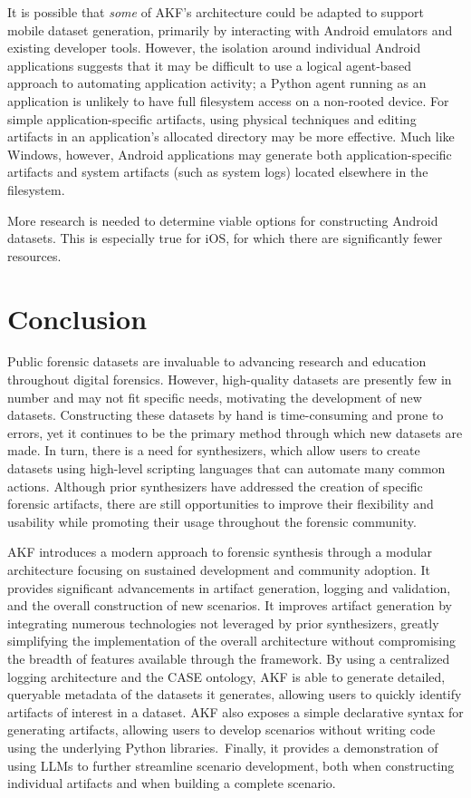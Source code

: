 \documentclass[letterpaper,12pt]{report}
\begin{document}
It is possible that \emph{some} of AKF's architecture could be adapted
to support mobile dataset generation, primarily by interacting with
Android emulators and existing developer tools. However, the isolation
around individual Android applications suggests that it may be difficult
to use a logical agent-based approach to automating application
activity; a Python agent running as an application is unlikely to have
full filesystem access on a non-rooted device. For simple
application-specific artifacts, using physical techniques and editing
artifacts in an application's allocated directory may be more effective.
Much like Windows, however, Android applications may generate both
application-specific artifacts and system artifacts (such as system
logs) located elsewhere in the filesystem.

More research is needed to determine viable options for constructing
Android datasets. This is especially true for iOS, for which there are
significantly fewer resources.

\chapter{Conclusion}\label{chapter-nine}

Public forensic datasets are invaluable to advancing research and
education throughout digital forensics. However, high-quality datasets
are presently few in number and may not fit specific needs, motivating
the development of new datasets. Constructing these datasets by hand is
time-consuming and prone to errors, yet it continues to be the primary
method through which new datasets are made. In turn, there is a need for
synthesizers, which allow users to create datasets using high-level
scripting languages that can automate many common actions. Although
prior synthesizers have addressed the creation of specific forensic
artifacts, there are still opportunities to improve their flexibility
and usability while promoting their usage throughout the forensic
community.

AKF introduces a modern approach to forensic synthesis through a modular
architecture focusing on sustained development and community adoption.
It provides significant advancements in artifact generation, logging and
validation, and the overall construction of new scenarios. It improves
artifact generation by integrating numerous technologies not leveraged
by prior synthesizers, greatly simplifying the implementation of the
overall architecture without compromising the breadth of features
available through the framework. By using a centralized logging
architecture and the CASE ontology, AKF is able to generate detailed,
queryable metadata of the datasets it generates, allowing users to
quickly identify artifacts of interest in a dataset. AKF also exposes a
simple declarative syntax for generating artifacts, allowing users to
develop scenarios without writing code using the underlying Python
libraries.~Finally, it provides a demonstration of using LLMs to further
streamline scenario development, both when constructing individual
artifacts and when building a complete scenario.
\end{document}
